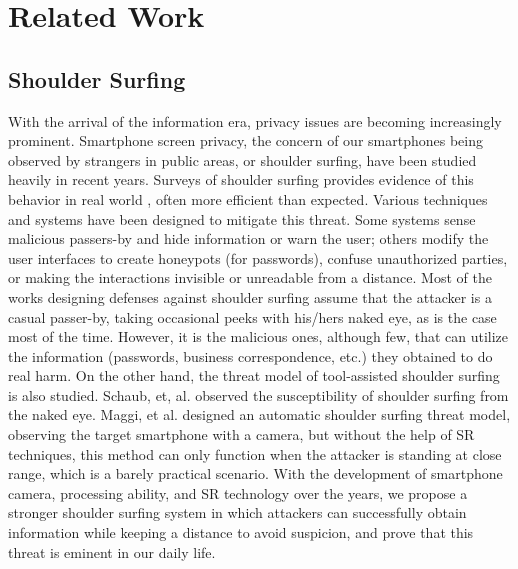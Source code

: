 \section{Related Work}
\label{sec-related-work}
\subsection{Shoulder Surfing}
With the arrival of the information era, privacy issues are becoming increasingly prominent. Smartphone screen privacy, the concern of our smartphones being observed by strangers in public areas, or shoulder surfing, have been studied heavily in recent years. Surveys of shoulder surfing provides evidence of this behavior in real world \cite{eiband2017understanding} \cite{goucher2011look}, often more efficient than expected\cite{kwon2013covert}. Various techniques and systems have been designed to mitigate this threat. Some systems sense malicious passers-by and hide information \cite{brudy2014anyone} or warn the user\cite{saad2018communicating}; others modify the user interfaces to create honeypots (for passwords)\cite{chakraborty2014tag}, confuse unauthorized parties\cite{wiedenbeck2006design}, or making the interactions invisible\cite{kumar2007reducing} or unreadable from a distance\cite{Chun2019Keep}. Most of the works designing defenses against shoulder surfing assume that the attacker is a casual passer-by, taking occasional peeks with his/hers naked eye, as is the case most of the time\cite{eiband2017understanding}. However, it is the malicious ones, although few, that can utilize the information (passwords, business correspondence, etc.) they obtained to do real harm. On the other hand, the threat model of tool-assisted shoulder surfing is also studied. Schaub, et, al. observed the susceptibility of shoulder surfing from the naked eye\cite{schaub2012password}. Maggi, et al. designed an automatic shoulder surfing threat model, observing the target smartphone with a camera\cite{maggi2011poster}, but without the help of SR techniques, this method can only function when the attacker is standing at close range, which is a barely practical scenario. With the development of smartphone camera, processing ability, and SR technology over the years, we propose a stronger shoulder surfing system in which attackers can successfully obtain information while keeping a distance to avoid suspicion, and prove that this threat is eminent in our daily life.

